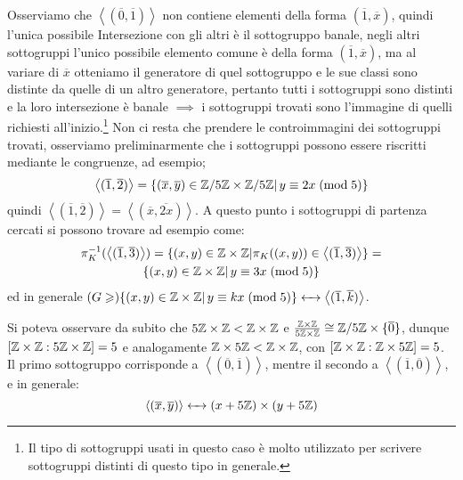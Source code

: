 \documentclass[11pt]{scrartcl}
\begin{document}
\begin{soln}
	 Osserviamo che $\left<(\overline 0, \overline 1)\right>$ non contiene elementi della forma $(\overline 1, \overline x)$, quindi l'unica possibile Intersezione con gli altri è il sottogruppo banale,
	negli altri sottogruppi l'unico possibile elemento comune è della forma $(\overline 1, \overline x)$, ma al variare di $\overline x$ otteniamo il generatore di quel sottogruppo e le sue classi sono distinte da quelle 
	di un altro generatore, pertanto tutti i sottogruppi sono distinti e la loro intersezione è banale $\implies$ i sottogruppi trovati sono l'immagine di quelli richiesti all'inizio.\footnote{Il tipo di sottogruppi 
	usati in questo caso è molto utilizzato per scrivere sottogruppi distinti di questo tipo in generale.} Non ci resta che prendere le controimmagini dei sottogruppi trovati, osserviamo preliminarmente che i sottogruppi
	possono essere riscritti mediante le congruenze, ad esempio;
		\[ \left<(\overline 1, \overline 2)\right> = \{(\overline x, \overline y)\in \mathbb{Z}/{5}\mathbb{Z} \times \mathbb{Z}/{5}\mathbb{Z} | \, y \equiv 2x \; (\text{mod}\; 5) \}
			\]
	quindi $\left<(\overline 1, \overline 2)\right> = \left<(\overline x, \overline{2x})\right>$. A questo punto i sottogruppi di partenza cercati si possono trovare ad esempio come:
		\begin{multline*}
		\pi_K^{-1}(\left<(\overline 1, \overline 3)\right>) = \{(x,y) \in \mathbb Z \times \mathbb Z | \pi_K((x,y)) \in \left<(\overline 1, \overline 3)\right>\} = \\
		 \{(x,y) \in \mathbb Z \times \mathbb Z | \, y \equiv 3x \; (\text{mod}\; 5) \}
		\end{multline*}	
		ed in generale $(G \geqslant)\{(x,y) \in \mathbb Z \times \mathbb Z | \, y \equiv kx \; (\text{mod}\; 5)\} \leftarrow\mathrel{\mkern-7mu}\rightarrow \left<(\overline 1, \overline k)\right>$.
\end{soln}

\begin{remark}
	Si poteva osservare da subito che $5\mathbb Z \times \mathbb Z < \mathbb Z \times \mathbb Z$ e $\frac{\mathbb Z \times \mathbb Z}{5\mathbb Z \times \mathbb Z} \cong \mathbb{Z}/{5}\mathbb{Z} \times \{\overline 0\}$, dunque 
	$[\mathbb Z \times \mathbb Z : 5\mathbb Z \times \mathbb Z] = 5$ e analogamente $\mathbb Z \times 5\mathbb Z < \mathbb Z \times \mathbb Z$, con $[\mathbb Z \times \mathbb Z : \mathbb Z \times 5\mathbb Z] = 5$. Il primo sottogruppo corrisponde
	a $\left<(\overline 0, \overline 1)\right>$, mentre il secondo a $\left<(\overline 1, \overline 0)\right>$, e in generale:
		\[ \left<(\overline x, \overline y)\right> \leftarrow\mathrel{\mkern-7mu}\rightarrow (x + 5\mathbb Z) \times (y + 5\mathbb Z)
			\]
\end{remark}
\end{document}
